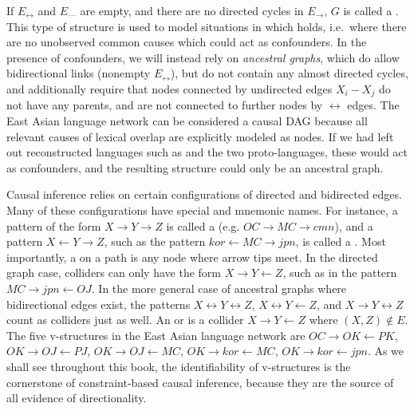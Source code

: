 If $E_\leftrightarrow$ and $E_\text{---}$ are empty, and there are no directed cycles in $E_\rightarrow$, $G$ is called a \textit{}. This type of structure is used to model situations in which  holds, i.e.\ where there are no unobserved common causes which could act as confounders. In the presence of confounders, we will instead rely on \textit{ancestral graphs}, which do allow bidirectional links (nonempty $E_\leftrightarrow$), but do not contain any almost directed cycles, and additionally require that nodes connected by undirected edges $X_i - X_j$ do not have any parents, and are not connected to further nodes by $\leftrightarrow$ edges. The East Asian language network can be considered a causal DAG because all relevant causes of lexical overlap are explicitly modeled as nodes. If we had left out reconstructed languages such as  and the two proto-languages, these would act as confounders, and the resulting structure could only be 
an ancestral graph.

\largerpage
Causal inference relies on certain configurations of directed and bidirected edges. Many of these configurations have special and mnemonic names. For instance, a pattern of the form $X \rightarrow Y \rightarrow Z$ is called a \textit{} (e.g. $OC \rightarrow MC \rightarrow cmn$), and a pattern $X \leftarrow Y \rightarrow Z$, such as the pattern $kor \leftarrow MC \rightarrow jpn$, is called a \textit{}.
Most importantly, a \textit{} on a path is any node where arrow tips meet. In the directed graph case, colliders can only have the form $X \rightarrow Y \leftarrow Z$, such as in the pattern $MC \rightarrow jpn \leftarrow OJ$. In the more general case of ancestral graphs where bidirectional edges exist, the patterns $X \leftrightarrow Y \leftrightarrow Z$, $X \leftrightarrow Y \leftarrow Z$, and $X \rightarrow Y \leftrightarrow Z$ count as colliders just as well. An  or \textit{} is a collider $X \rightarrow Y \leftarrow Z$ where $(X,Z) \notin E$. The five v-structures in the East Asian language network are $OC \rightarrow OK \leftarrow PK$, $OK \rightarrow OJ \leftarrow PJ$, $OK \rightarrow OJ \leftarrow MC$, $OK \rightarrow kor \leftarrow MC$, $OK \rightarrow kor \leftarrow jpn$. As we shall see throughout this book, the identifiability of v-structures is the cornerstone of constraint-based causal inference, because they are the source of all evidence 
of directionality.

